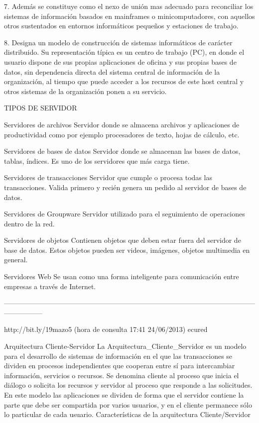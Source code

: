 7. Además se constituye como el nexo de unión mas adecuado para reconciliar los sistemas de información basados en mainframes 
o minicomputadores, con aquellos otros sustentados en entornos informáticos pequeños y estaciones de trabajo.

8. Designa un modelo de construcción de sistemas informáticos de carácter distribuido.
Su representación típica es un centro de trabajo (PC), en donde el usuario dispone de sus propias aplicaciones de oficina y 
sus propias bases de datos, sin dependencia directa del sistema central de información de la organización, al tiempo que puede 
acceder a los recursos de este host central y otros sistemas de la organización ponen a su servicio.


 TIPOS DE SERVIDOR

Servidores de archivos
Servidor donde se almacena archivos y aplicaciones de productividad como por ejemplo procesadores de texto, hojas de cálculo, etc.

Servidores de bases de datos
Servidor donde se almacenan las bases de datos, tablas, índices. Es uno de los servidores que más carga tiene.

Servidores de transacciones
Servidor que cumple o procesa todas las transacciones. Valida primero y recién genera un pedido al servidor de bases de datos.

Servidores de Groupware
Servidor utilizado para el seguimiento de operaciones dentro de la red.

Servidores de objetos
Contienen objetos que deben estar fuera del servidor de base de datos. Estos objetos pueden ser videos, imágenes, 
objetos multimedia en general.

Servidores Web
Se usan como una forma inteligente para comunicación entre empresas a través de Internet.


-----------------------------------------------------------------------------------------------------------------------------

http://bit.ly/19mazo5 (hora de consulta 17:41 24/06/2013)
ecured


 Arquitectura Cliente-Servidor
La Arquitectura_Cliente_Servidor es un modelo para el desarrollo de sistemas de información en el que las transacciones se 
dividen en procesos independientes que cooperan entre sí para intercambiar información, servicios o recursos. Se denomina 
cliente al proceso que inicia el diálogo o solicita los recursos y servidor al proceso que responde a las solicitudes. En 
este modelo las aplicaciones se dividen de forma que el servidor contiene la parte que debe ser compartida por varios usuarios, 
y en el cliente permanece sólo lo particular de cada usuario.
Características de la arquitectura Cliente/Servidor

